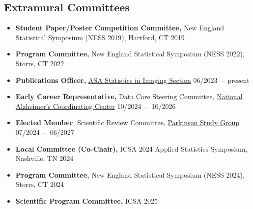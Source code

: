 \documentclass[12pt,letterpaper]{article}
\newenvironment{cventry}{\begin{minipage}[t]{\linewidth}}{\end{minipage}}
\begin{document}
	\subsection*{Extramural Committees}
	\begin{itemize}
		\item\begin{cventry} {\bf Student Paper/Poster Competition Committee,} New 
		England Statistical Symposium (NESS 2019), Hartford, CT 
		\hfill 2019
		\par\end{cventry}
		\item\begin{cventry} {\bf Program Committee,} New England Statistical 
		Symposium (NESS 2022), Storrs, CT \hfill 2022
		\par\end{cventry}
		\item\begin{cventry} {\bf Publications Officer,} 
		\href{https://www.statsinimaging.org/}{ASA Statistics in 
		Imaging Section} \hfill \mbox{06/2023 -- present}
		\par\end{cventry}
		\item\begin{cventry} {\bf Early Career Representative,} Data Core Steering 
		Committee, 
		\href{https://naccdata.org/}{National Alzheimer's Coordinating Center} 
		\hfill \mbox{10/2024 -- 10/2026}
		\par\end{cventry}
		\item\begin{cventry} {\bf Elected Member}, Scientific Review Committee, 
		\href{https://parkinson-study-group.org/}{Parkinson Study 
		Group} \hfill 
		\mbox{07/2024 -- 06/2027}
		\par\end{cventry}
		\item\begin{cventry} {\bf Local Committee (Co-Chair),} ICSA 2024 Applied 
		Statistics Symposium, Nashville, TN \hfill \mbox{2024}
		\par\end{cventry}
		\item\begin{cventry} {\bf Program Committee,} New England Statistical 
		Symposium (NESS 2024), Storrs, CT \hfill 2024
		\par\end{cventry}
		\item\begin{cventry} {\bf Scientific Program Committee,} ICSA 2025 

\end{cventry}
\end{itemize}
\end{document}
